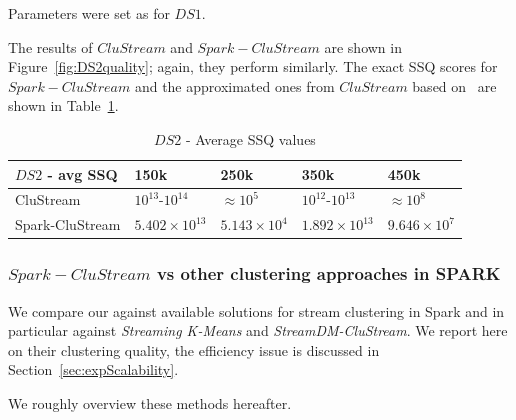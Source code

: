Parameters were set as for $DS1$.



The results of $CluStream$ and $Spark-CluStream$ are shown in Figure~\ref{fig:DS2quality}; again, they perform similarly. The exact SSQ scores for $Spark-CluStream$ and the approximated ones from $CluStream$ based on~\cite{CluStream} are shown in Table~\ref{tab:DS2quality}.
\begin{table}[t]
\centering
\begin{tabular}{|l|l|l|l|l|}\hline
\textbf{$DS2$ - avg SSQ} & \textbf{150k} & \textbf{250k} & \textbf{350k} & \textbf{450k}\\\hline
CluStream & $10^{13}$-$10^{14}$ & $\approx 10^{5}$ & $10^{12}$-$10^{13}$ & $\approx 10^{8}$\\\hline
Spark-CluStream & $5.402\times10^{13}$ & $5.143\times10^{4}$ & $1.892\times10^{13}$ & $9.646\times10^7$\\\hline
  \end{tabular}
  \caption{$DS2$ - Average SSQ values}
  \label{tab:DS2quality}
\end{table}

\subsubsection{$Spark-CluStream$ vs other clustering approaches in SPARK}
\label{sec:expQuality-vs-SPARK}
We compare our \our against available solutions for stream clustering in Spark and in particular against \textit{Streaming K-Means} and \textit{StreamDM-CluStream}.
We report here on their clustering quality, the efficiency issue is discussed in Section~\ref{sec:expScalability}.

We roughly overview these methods hereafter.


